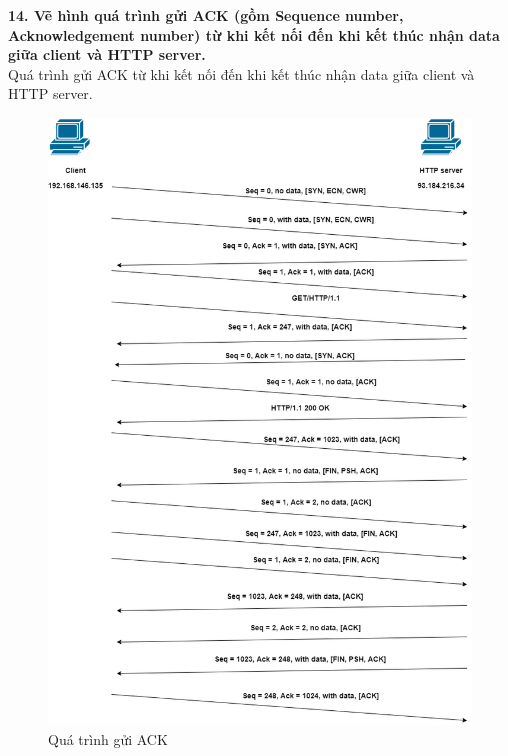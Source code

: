 \textbf{14. Vẽ hình quá trình gửi ACK (gồm Sequence number, Acknowledgement number) từ khi kết nối đến khi kết thúc nhận data giữa client và HTTP server.}\\
Quá trình gửi ACK từ khi kết nối đến khi kết thúc nhận data giữa client và HTTP server.
\begin{figure}[H]
\begin{center}
\includegraphics[scale=.6]{../figures/p2/p2_diagram}
\end{center}
\caption{Quá trình gửi ACK}
\end{figure}



